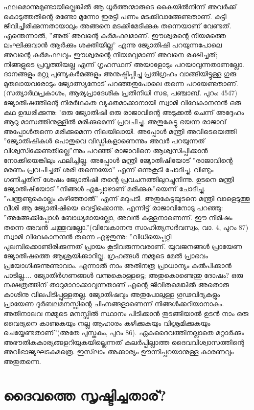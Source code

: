 ഫലമൊന്നുമുണ്ടായില്ലെങ്കില്‍ ആ ധൂര്‍ത്തന്മാരുടെ കൈയില്‍നിന്ന് അവര്‍ക്ക് കൊടുത്തതിന്റെ രണ്ടോ മൂന്നോ ഇരട്ടി പണം മടക്കിവാങ്ങേണ്ടതാണ്. കുട്ടി ജീവിച്ചിരിക്കുന്നതായാലും അങ്ങനെ മടക്കിമേടിക്കുക തന്നെയാണ് വേണ്ടത്. എന്തെന്നാല്‍, ''അത് അവന്റെ കര്‍മഫലമാണ്. ഈശ്വരന്റെ നിയമത്തെ ലംഘിക്കുവാന്‍ ആര്‍ക്കും ശക്തിയില്ല'' എന്നു ജ്യോതിഷി പറയുന്നപോലെ അവന്റെ കര്‍മഫലവും ഈശ്വരന്റെ നിയമവുമാണ് അവനെ രക്ഷിച്ചത്; നിങ്ങളുടെ പ്രവൃത്തിയല്ല എന്ന് ഗൃഹസ്ഥന് അയാളോടും പറയാവുന്നതാണല്ലോ. ദാനങ്ങളും മറ്റു പുണ്യകര്‍മങ്ങളും അനുഷ്ഠിപ്പിച്ചു പ്രതിഗ്രഹം വാങ്ങിയിട്ടുള്ള ഗുരു മുതലായവരോടും ജ്യോത്സ്യനോട് പറഞ്ഞതുപോലെ തന്നെ പറയേണ്ടതാണ്.(സത്യാര്‍ഥപ്രകാശം, ആര്യപ്രാദേശിക പ്രതിനിധി സഭ, പഞ്ചാബ്. പുറം: 4547)
ജ്യോതിഷത്തിന്റെ നിരര്‍ഥകത വ്യക്തമാക്കാനായി സ്വാമി വിവേകാനന്ദന്‍ ഒരു കഥ ഉദ്ധരിക്കുന്നു: 'ഒരു ജ്യോതിഷി ഒരു രാജാവിന്റെ അടുക്കല്‍ ചെന്ന് അദ്ദേഹം ആറു മാസത്തിനുള്ളില്‍ മരിക്കുമെന്ന് പ്രവചിച്ചു. അതുകേട്ടു ഭയന്ന രാജാവ് അപ്പോള്‍തന്നെ മരിക്കുമെന്ന നിലയിലായി. അപ്പോള്‍ മന്ത്രി അവിടെയെത്തി ''ജ്യോതിഷികള്‍ പൊതുവെ വിഡ്ഢികളാണെന്നും അവര്‍ പറയുന്നത് വിശ്വസിക്കേണ്ടതില്ലെ''ന്നും പറഞ്ഞ് രാജാവിനെ ആശ്വസിപ്പിക്കാന്‍ നോക്കിയെങ്കിലും ഫലിച്ചില്ല. അപ്പോള്‍ മന്ത്രി ജ്യോതിഷിയോട് ''രാജാവിന്റെ മരണം പ്രവചിച്ചത് ശരി തന്നെയോ'' എന്ന് ഒന്നുകൂടി ചോദിച്ചു. വീണ്ടും ഗണിച്ചതിന് ശേഷം ജ്യോതിഷി തന്റെ പ്രവചനത്തിലുറച്ചുനിന്നു. ഉടനെ മന്ത്രി ജ്യോതിഷിയോട് ''നിങ്ങള്‍ എപ്പോഴാണ് മരിക്കുക''യെന്ന് ചോദിച്ചു. ''പന്ത്രണ്ടുകൊല്ലം കഴിഞ്ഞാല്‍'' എന്ന് മറുപടി. അതുകേട്ടയുടനെ മന്ത്രി വാളെടുത്തു വീശി ആ ജ്യോതിഷിയെ വെട്ടിക്കൊന്നു. എന്നിട്ട് രാജാവിനോടു പറഞ്ഞു: ''അങ്ങേക്കിപ്പോള്‍ ബോധ്യമായല്ലോ, അവന്‍ കള്ളനാണെന്ന്. ഈ നിമിഷം തന്നെ അവന്‍ ചത്തുവല്ലോ.''(വിവേകാനന്ദ സാഹിത്യസര്‍വസ്വം, വാ. 4, പുറം 87)
സ്വാമി വിവേകാനന്ദന്‍ തന്നെ എഴുതുന്നു: ''വിധിയെപ്പറ്റി പുലമ്പിക്കൊണ്ടിരിക്കുന്നത് പ്രായം കൂടിവരുന്നവരാണ്. യുവജനങ്ങള്‍ പ്രായേണ ജ്യോതിഷത്തെ ആശ്രയിക്കാറില്ല. ഗ്രഹങ്ങള്‍ നമ്മുടെ മേല്‍ പ്രാഭവം പ്രയോഗിക്കുന്നുണ്ടാവാം. എന്നാല്‍ നാം അതിനത്ര പ്രാധാന്യം കല്‍പിക്കാന്‍ പാടില്ല.... ജ്യോതിര്‍ഗണങ്ങള്‍ വന്നുകൊള്ളട്ടെ; അതുകൊണ്ടെന്തു ദോഷം? ഒരു നക്ഷത്രത്തിന് താറുമാറാക്കാവുന്നതാണ് എന്റെ ജീവിതമെങ്കില്‍ അതൊരു കാശിനു വിലപിടിപ്പുള്ളതല്ല. ജ്യോതിഷവും അതുപോലുള്ള ഗൂഢവിദ്യകളും പ്രായേണ ദുര്‍ബലമനസ്സിന്റെ ചിഹ്നങ്ങളാണെന്ന് നിങ്ങള്‍ക്കറിയാനാകും. അതിനാലവ നമ്മുടെ മനസ്സില്‍ സ്ഥാനം പിടിക്കാന്‍ തുടങ്ങിയാല്‍ ഉടന്‍ നാം ഒരു വൈദ്യനെ കാണുകയും നല്ല ആഹാരം കഴിക്കുകയും വിശ്രമിക്കുകയും ചെയ്യേണ്ടതാണ്''(അതേ പുസ്തകം, പുറം 86).
ഏകദൈവത്തിനല്ലാതെ മറ്റാര്‍ക്കും അഭൗതികകാര്യങ്ങളറിയുകയില്ലെന്നത് കലര്‍പ്പില്ലാത്ത ദൈവവിശ്വാസത്തിന്റെ അവിഭാജ്യഘടകമത്രെ. ഇസ്‌ലാം അക്കാര്യം ഊന്നിപ്പറയാനുള്ള കാരണവും അതുതന്നെ.
\chapter{ദൈവത്തെ സൃഷ്ടിച്ചതാര്? }
